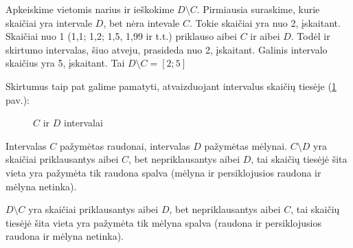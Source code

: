 \documentclass[a4paper]{article}
\begin{document}
Apkeiskime vietomis narius ir ieškokime $D \setminus C$. Pirmiausia suraskime,
kurie skaičiai yra intervale
$D$, bet nėra intevale $C$. Tokie skaičiai yra nuo 2, įskaitant. Skaičiai nuo 1
(1,1; 1,2; 1,5, 1,99 ir t.t.) priklauso aibei $C$ ir aibei $D$. Todėl ir
skirtumo intervalas, šiuo atveju, prasideda nuo 2, įskaitant. Galinis intervalo
skaičius yra 5, įskaitant. Tai $D \setminus C = [2;5]$

Skirtumus taip pat galime pamatyti, atvaizduojant intervalus skaičių
tiesėje (\ref{fig:set_difference_number_line} pav.):

\begin{figure}[!htbp]
      \centering
      \caption{$C$ ir $D$ intervalai}\label{fig:set_difference_number_line}
\end{figure}

Intervalas $C$ pažymėtas raudonai, intervalas $D$ pažymėtas mėlynai. $C
      \setminus D$ yra skaičiai priklausantys aibei $C$, bet nepriklausantys
aibei
$D$, tai skaičių tiesėjė šita vieta yra pažymėta tik raudona spalva (mėlyna ir
persiklojusios raudona ir mėlyna netinka).

$D \setminus C$ yra skaičiai priklausantys aibei $D$, bet nepriklausantys aibei
$C$, tai skaičių tiesėjė šita vieta yra pažymėta tik mėlyna spalva (raudona ir
persiklojusios raudona ir mėlyna netinka).
\end{document}

